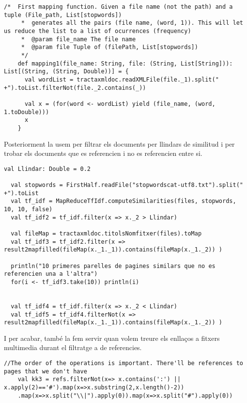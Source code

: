 \documentclass{report}
\begin{document}
\newpage

\begin{lstlisting}[style=scalaHighlight]
/*	First mapping function. Given a file name (not the path) and a tuple (File_path, List[stopwords])
     * 	generates all the pairs (file name, (word, 1)). This will let us reduce the list to a list of ocurrences (frequency)
     * 	@param file_name The file name
     * 	@param file Tuple of (filePath, List[stopwords])
     */
    def mapping1(file_name: String, file: (String, List[String])): List[(String, (String, Double))] = {
      val wordList = tractaxmldoc.readXMLFile(file._1).split(" +").toList.filterNot(file._2.contains(_))

      val x = (for(word <- wordList) yield (file_name, (word, 1.toDouble)))
      x
    }
\end{lstlisting}

Posteriorment la usem per filtrar els documents per llindars de similitud i per trobar els documents que es referencien i no es referencien entre si.

\begin{lstlisting}[style=scalaHighlight]
  val Llindar: Double = 0.2

  val stopwords = FirstHalf.readFile("stopwordscat-utf8.txt").split(" +").toList
  val tf_idf = MapReduceTfIdf.computeSimilarities(files, stopwords, 10, 10, false)
  val tf_idf2 = tf_idf.filter(x => x._2 > Llindar)

  val fileMap = tractaxmldoc.titolsNomfitxer(files).toMap
  val tf_idf3 = tf_idf2.filter(x => result2mapfilled(fileMap(x._1._1)).contains(fileMap(x._1._2)) )

  println("10 primeres parelles de pagines similars que no es referencien una a l'altra")
  for(i <- tf_idf3.take(10)) println(i)


  val tf_idf4 = tf_idf.filter(x => x._2 < Llindar)
  val tf_idf5 = tf_idf4.filterNot(x => result2mapfilled(fileMap(x._1._1)).contains(fileMap(x._1._2)) )
\end{lstlisting}

\newpage

I per acabar, també la fem servir quan volem treure els enllaços a fitxers multimedia durant el filtratge a de referencies.

\begin{lstlisting}[style=scalaHighlight]
//The order of the operations is important. There'll be references to pages that we don't have
	val kk3 = refs.filterNot(x=> x.contains(':') || x.apply(2)=='#').map(x=>x.substring(2,x.length()-2))
    .map(x=>x.split("\\|").apply(0)).map(x=>x.split("#").apply(0))
\end{lstlisting}
\end{document}
